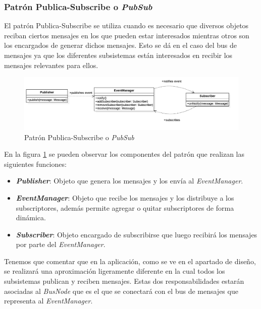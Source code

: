 \subsubsection{Patrón Publica-Subscribe o \textit{PubSub}}

El patrón Publica-Subscribe se utiliza cuando es necesario que diversos objetos reciban ciertos mensajes en los que pueden estar interesados mientras otros son los encargados de generar dichos mensajes. Esto se dá en el caso del  bus de mensajes ya que los diferentes subsistemas están interesados en recibir los mensajes relevantes para ellos.

\bigskip

\begin{figure}
	\centerline{\includegraphics[width=12cm]{otros/UML/png/pubsub.png}}
	\caption{Patrón Publica-Subscribe o \textit{PubSub}}
		\label{pat:pubsub}
\end{figure}

\bigskip
 
En la figura \ref{pat:pubsub} se pueden observar los componentes del patrón que realizan las siguientes funciones:

\begin{itemize}
	\item \textbf{\textit{Publisher}}: Objeto que genera los mensajes y los envía al \textit{EventManager}.
	\item \textbf{\textit{EventManager}}: Objeto que recibe los mensajes y los distribuye a los subscriptores, además permite agregar o quitar subscriptores de forma dinámica.
	\item \textbf{\textit{Subscriber}}: Objeto encargado de subscribirse que luego recibirá los mensajes por parte del \textit{EventManager}.
\end{itemize}

\bigskip

Tenemos que comentar que en la aplicación, como se ve en el apartado de diseño, se realizará una aproximación ligeramente diferente en la cual todos los subsistemas publican y reciben mensajes. Estas dos responsabilidades estarán asociadas al \textit{BusNode} que es el que se conectará con el bus de mensajes que representa al \textit{EventManager}.


